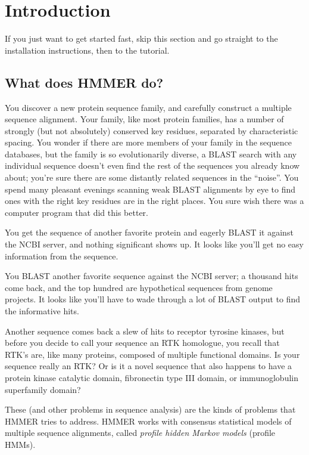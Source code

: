 \section{Introduction}

If you just want to get started fast, skip this section and go
straight to the installation instructions, then to the tutorial.

\subsection{What does HMMER do?}

You discover a new protein sequence family, and carefully construct a
multiple sequence alignment. Your family, like most protein families,
has a number of strongly (but not absolutely) conserved key residues,
separated by characteristic spacing. You wonder if there are more
members of your family in the sequence databases, but the family is so
evolutionarily diverse, a BLAST search with any individual sequence
doesn't even find the rest of the sequences you already know about;
you're sure there are some distantly related sequences in the
``noise''. You spend many pleasant evenings scanning weak BLAST
alignments by eye to find ones with the right key residues are in the
right places. You sure wish there was a computer program that did this
better.

You get the sequence of another favorite protein and eagerly BLAST it
against the NCBI server, and nothing significant shows up. It looks
like you'll get no easy information from the sequence.

You BLAST another favorite sequence against the NCBI server; a
thousand hits come back, and the top hundred are hypothetical
sequences from genome projects. It looks like you'll have to wade
through a lot of BLAST output to find the informative hits.

Another sequence comes back a slew of hits to receptor tyrosine
kinases, but before you decide to call your sequence an RTK homologue,
you recall that RTK's are, like many proteins, composed of multiple
functional domains. Is your sequence really an RTK? Or is it a novel
sequence that also happens to have a protein kinase catalytic domain,
fibronectin type III domain, or immunoglobulin superfamily domain?

These (and other problems in sequence analysis) are the kinds of
problems that HMMER tries to address. HMMER works with consensus
statistical models of multiple sequence alignments, called
\emph{profile hidden Markov models} (profile HMMs).

